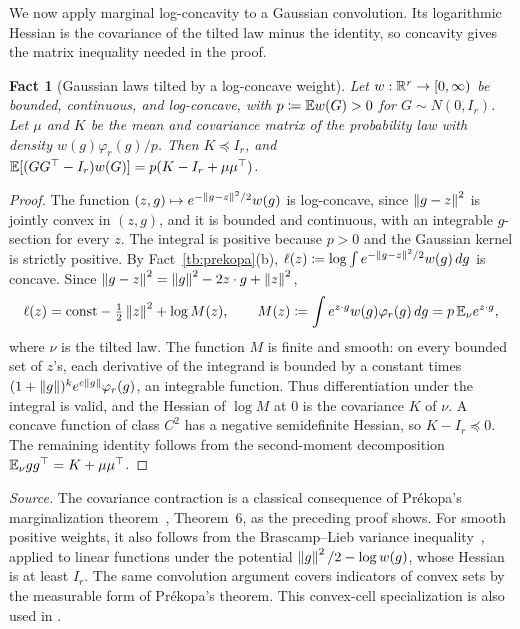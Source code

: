 \documentclass[11pt,letterpaper]{article}
\theoremstyle{plain}
\newtheorem{fact}{Fact}[section]
\begin{document}
We now apply marginal log-concavity to a Gaussian convolution. Its
logarithmic Hessian is the covariance of the tilted law minus the
identity, so concavity gives the matrix inequality needed in the proof.

\begin{fact}[Gaussian laws tilted by a log-concave weight]\label{tb:tilt}
Let \(w:\mathbb R^r\to[0,\infty)\) be bounded, continuous, and log-concave, with
\(p\coloneqq \mathbb E w(G)>0\) for \(G\sim N(0,I_r)\). Let \(\mu\) and \(K\) be the mean and
covariance matrix of the probability law with density \(w(g)\varphi_r(g)/p\).
Then \(K\preceq I_r\), and
\(\mathbb E[(GG^\top-I_r)w(G)]=p(K-I_r+\mu\mu^\top)\).
\end{fact}

\begin{proof}
The function \((z,g)\mapsto e^{-\left\lVert g-z\right\rVert^2/2}w(g)\) is log-concave, since
\(\left\lVert g-z\right\rVert^2\) is jointly convex in \((z,g)\), and it is bounded and
continuous, with an integrable \(g\)-section for every \(z\).
The integral is positive because \(p>0\) and the Gaussian kernel is
strictly positive. By Fact~\ref{tb:prekopa}(b), \(\ell(z)\coloneqq \log\int e^{-\left\lVert g-z\right\rVert^2/2}
w(g)\,dg\) is concave. Since \(\left\lVert g-z\right\rVert^2=\left\lVert g\right\rVert^2-2z\cdot g+\left\lVert z\right\rVert^2\),
\[
 \ell(z)=\text{const}-\tfrac12\left\lVert z\right\rVert^2+\log M(z),\qquad
 M(z)\coloneqq \int e^{z\cdot g}w(g)\varphi_r(g)\,dg=p\,\mathbb E_\nu e^{z\cdot g},
\]
where \(\nu\) is the tilted law. The function \(M\) is finite and smooth: on every bounded set of
\(z\)'s, each derivative of the integrand is bounded by a constant
times \((1+\left\lVert g\right\rVert)^k e^{c\left\lVert g\right\rVert}\varphi_r(g)\), an integrable function.
Thus differentiation under the integral is valid, and the Hessian of \(\log M\) at \(0\) is the
covariance \(K\) of \(\nu\). A concave function of class \(C^2\) has a
negative semidefinite Hessian, so \(K-I_r\preceq0\). The remaining identity
follows from the second-moment decomposition \(\mathbb E_\nu gg^\top=K+\mu\mu^\top\).
\end{proof}

\emph{Source.} The covariance contraction is a classical consequence of
Pr\'ekopa's marginalization theorem~, Theorem~6, as the
preceding proof shows. For smooth positive weights, it also follows
from the Brascamp--Lieb variance inequality~, applied to
linear functions under the potential \(\left\lVert g\right\rVert^2/2-\log w(g)\), whose
Hessian is at least \(I_r\). The same convolution argument covers
indicators of convex sets by the measurable form of Pr\'ekopa's
theorem. This convex-cell specialization is also used in .
\end{document}

